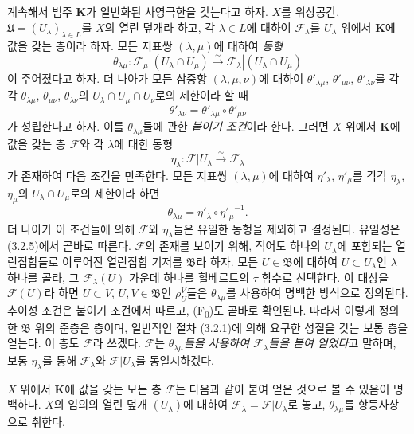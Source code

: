 \begin{env}[3.3.1]
\label{0.3.3.1-ko}
계속해서 범주 $\mathbf K$가 일반화된 사영극한을 갖는다고 하자. $X$를 위상공간, $\mathfrak U=(U_\lambda)_{\lambda\in L}$를 $X$의 열린 덮개라 하고, 각 $\lambda\in L$에 대하여 $\mathcal F_\lambda$를 $U_\lambda$ 위에서 $\mathbf K$에 값을 갖는 층이라 하자. 모든 지표쌍 $(\lambda,\mu)$에 대하여 \emph{동형}
\[
  \theta_{\lambda\mu}:
  \mathcal F_\mu|(U_\lambda\cap U_\mu)
  \xrightarrow{\sim}
  \mathcal F_\lambda|(U_\lambda\cap U_\mu)
\]
이 주어졌다고 하자. 더 나아가 모든 삼중항 $(\lambda,\mu,\nu)$에 대하여 $\theta'_{\lambda\mu}$, $\theta'_{\mu\nu}$, $\theta'_{\lambda\nu}$를 각각 $\theta_{\lambda\mu}$, $\theta_{\mu\nu}$, $\theta_{\lambda\nu}$의 $U_\lambda\cap U_\mu\cap U_\nu$로의 제한이라 할 때
\[
  \theta'_{\lambda\nu}
  =\theta'_{\lambda\mu}\circ\theta'_{\mu\nu}
\]
가 성립한다고 하자. 이를 $\theta_{\lambda\mu}$들에 관한 \emph{붙이기 조건}이라 한다. 그러면 $X$ 위에서 $\mathbf K$에 값을 갖는 층 $\mathcal F$와 각 $\lambda$에 대한 동형
\[
  \eta_\lambda:\mathcal F|U_\lambda
  \xrightarrow{\sim}\mathcal F_\lambda
\]
가 존재하여 다음 조건을 만족한다. 모든 지표쌍 $(\lambda,\mu)$에 대하여 $\eta'_\lambda$, $\eta'_\mu$를 각각 $\eta_\lambda$, $\eta_\mu$의 $U_\lambda\cap U_\mu$로의 제한이라 하면
\[
  \theta_{\lambda\mu}
  =\eta'_\lambda\circ{\eta'_\mu}^{-1}.
\]
더 나아가 이 조건들에 의해 $\mathcal F$와 $\eta_\lambda$들은 유일한 동형을 제외하고 결정된다. 유일성은 (3.2.5)에서 곧바로 따른다. $\mathcal F$의 존재를 보이기 위해, 적어도 하나의 $U_\lambda$에 포함되는 열린집합들로 이루어진 열린집합 기저를 $\mathfrak B$라 하자. 모든 $U\in\mathfrak B$에 대하여 $U\subset U_\lambda$인 $\lambda$ 하나를 골라, 그 $\mathcal F_\lambda(U)$ 가운데 하나를 힐베르트의 $\tau$ 함수로 선택한다. 이 대상을 $\mathcal F(U)$라 하면 $U\subset V$, $U,V\in\mathfrak B$인 $\rho_U^V$들은 $\theta_{\lambda\mu}$를 사용하여 명백한 방식으로 정의된다. 추이성 조건은 붙이기 조건에서 따르고, (F\textsubscript{0})도 곧바로 확인된다. 따라서 이렇게 정의한 $\mathfrak B$ 위의 준층은 층이며, 일반적인 절차 (3.2.1)에 의해 요구한 성질을 갖는 보통 층을 얻는다. 이 층도 $\mathcal F$라 쓰겠다. $\mathcal F$는 \emph{$\theta_{\lambda\mu}$들을 사용하여 $\mathcal F_\lambda$들을 붙여 얻었다}고 말하며, 보통 $\eta_\lambda$를 통해 $\mathcal F_\lambda$와 $\mathcal F|U_\lambda$를 동일시하겠다.

$X$ 위에서 $\mathbf K$에 값을 갖는 모든 층 $\mathcal F$는 다음과 같이 붙여 얻은 것으로 볼 수 있음이 명백하다. $X$의 임의의 열린 덮개 $(U_\lambda)$에 대하여 $\mathcal F_\lambda=\mathcal F|U_\lambda$로 놓고, $\theta_{\lambda\mu}$를 항등사상으로 취한다.
\end{env}

